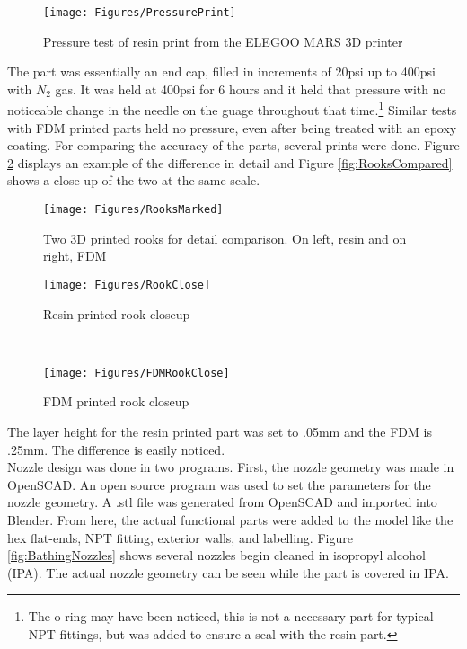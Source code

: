 \begin{figure}[h!]
\centering
\texttt{[image: Figures/PressurePrint]}
\caption{Pressure test of resin print from the ELEGOO MARS 3D printer}
\label{fig:PressurePrint}
\end{figure}
The part was essentially an end cap, filled in increments of 20psi up to 400psi with $N_2$ gas. It was held at 400psi for 6 hours and it held that pressure with no noticeable change in the needle on the guage throughout that time.\footnote{The o-ring may have been noticed, this is not a necessary part for typical NPT fittings, but was added to ensure a seal with the resin part.} Similar tests with FDM printed parts held no pressure, even after being treated with an epoxy coating. For comparing the accuracy of the parts, several prints were done. Figure \ref{fig:Rooks} displays an example of the difference in detail and Figure \ref{fig:RooksCompared} shows a close-up of the two at the same scale.\clearpage
\begin{figure}[h!]
\centering
\texttt{[image: Figures/RooksMarked]}
\caption{Two 3D printed rooks for detail comparison. On left, resin and on right, FDM}
\label{fig:Rooks}
\end{figure}
\begin{figure*}[h!]
    \centering
    \begin{subfigure}[t]{0.5\textwidth}
        \centering
        \texttt{[image: Figures/RookClose]}
        \caption{Resin printed rook closeup}
    \end{subfigure}%
    ~ 
    \begin{subfigure}[t]{0.5\textwidth}
        \centering
        \texttt{[image: Figures/FDMRookClose]}
        \caption{FDM printed rook closeup}
    \end{subfigure}
    \caption{Rook closeups}
\label{fig:RooksCompared}
\end{figure*}
The layer height for the resin printed part was set to .05mm and the FDM is .25mm. The difference is easily noticed.\\
Nozzle design was done in two programs. First, the nozzle geometry was made in OpenSCAD. An open source program was used to set the parameters for the nozzle geometry. A .stl file was generated from OpenSCAD and imported into Blender. From here, the actual functional parts were added to the model like the hex flat-ends, NPT fitting, exterior walls, and labelling. Figure \ref{fig:BathingNozzles} shows several nozzles begin cleaned in isopropyl alcohol (IPA). The actual nozzle geometry can be seen while the part is covered in IPA.
